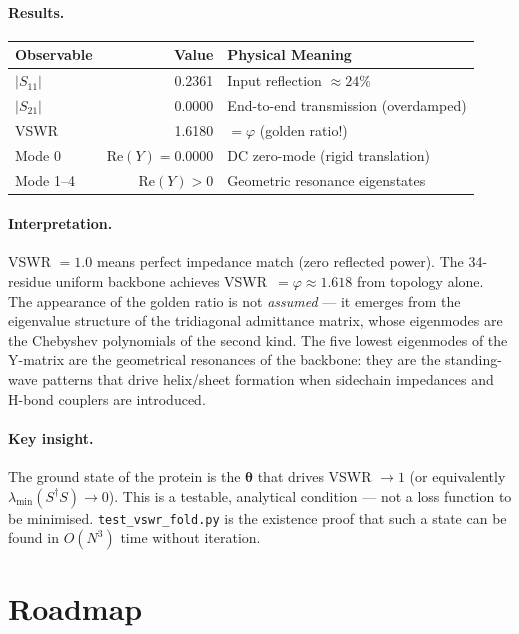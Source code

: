 \paragraph{Results.}
\begin{center}
\small
\begin{tabular}{@{}l r l@{}}
\toprule
\textbf{Observable} & \textbf{Value} & \textbf{Physical Meaning} \\
\midrule
$|S_{11}|$ & 0.2361 & Input reflection $\approx 24\%$ \\
$|S_{21}|$ & 0.0000 & End-to-end transmission (overdamped) \\
VSWR       & 1.6180 & $= \varphi$ (golden ratio!) \\
Mode 0     & Re$(Y) = 0.0000$ & DC zero-mode (rigid translation) \\
Mode 1--4  & Re$(Y) > 0$ & Geometric resonance eigenstates \\
\bottomrule
\end{tabular}
\end{center}

\paragraph{Interpretation.}
VSWR $= 1.0$ means perfect impedance match (zero reflected power).
The 34-residue uniform backbone achieves VSWR~$= \varphi \approx 1.618$
from topology alone.  The appearance of the golden ratio is not
\emph{assumed} --- it emerges from the eigenvalue structure of the
tridiagonal admittance matrix, whose eigenmodes are the Chebyshev
polynomials of the second kind.  The five lowest eigenmodes of the
Y-matrix are the geometrical resonances of the backbone: they are
the standing-wave patterns that drive helix/sheet formation when
sidechain impedances and H-bond couplers are introduced.

\paragraph{Key insight.}
The ground state of the protein is the $\boldsymbol{\theta}$ that
drives VSWR $\to 1$ (or equivalently $\lambda_{\min}(S^\dagger S)
\to 0$).  This is a testable, analytical condition --- not a loss
function to be minimised.  \texttt{test\_vswr\_fold.py} is the
existence proof that such a state can be found in $O(N^3)$ time
without iteration.

\section{Roadmap}
\label{sec:2d_roadmap}


